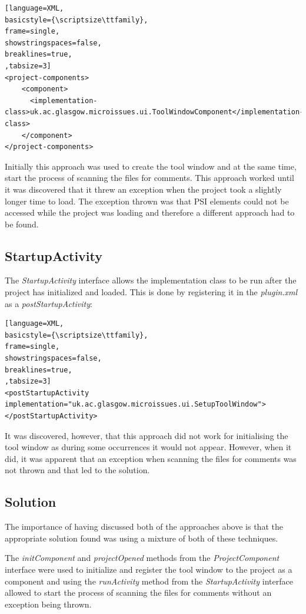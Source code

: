 \documentclass{4thYearProject}
\begin{document}
\begin{lstlisting}[language=XML, 
basicstyle={\scriptsize\ttfamily}, 
frame=single,
showstringspaces=false,
breaklines=true,
,tabsize=3]
<project-components>
    <component>
      <implementation-class>uk.ac.glasgow.microissues.ui.ToolWindowComponent</implementation-class>
    </component>
</project-components>
\end{lstlisting}

Initially this approach was used to create the tool window and at the same time, start the process of scanning the files for comments. This approach worked until it was discovered that it threw an exception when the project took a slightly longer time to load. The exception thrown was that PSI elements could not be accessed while the project was loading and therefore a different approach had to be found. 

\subsection{StartupActivity}

The \textit{StartupActivity} interface allows the implementation class to be run after the project has initialized and loaded. This is done by registering it in the \textit{plugin.xml} as a \textit{postStartupActivity}:   \\

\begin{lstlisting}[language=XML, 
basicstyle={\scriptsize\ttfamily}, 
frame=single,
showstringspaces=false,
breaklines=true,
,tabsize=3]
<postStartupActivity implementation="uk.ac.glasgow.microissues.ui.SetupToolWindow"></postStartupActivity>
\end{lstlisting}

It was discovered, however, that this approach did not work for initialising the tool window as during some occurrences it would not appear. However, when it did, it was apparent that an exception when scanning the files for comments was not thrown and that led to the solution.

\subsection{Solution}

The importance of having discussed both of the approaches above is that the appropriate solution found was using a mixture of both of these techniques. 

The \textit{initComponent} and \textit{projectOpened} methods from the \textit{ProjectComponent} interface were used to initialize and register the tool window to the project as a component and using the \textit{runActivity} method from the \textit{StartupActivity} interface allowed to start the process of scanning the files for comments without an exception being thrown.
\end{document}
